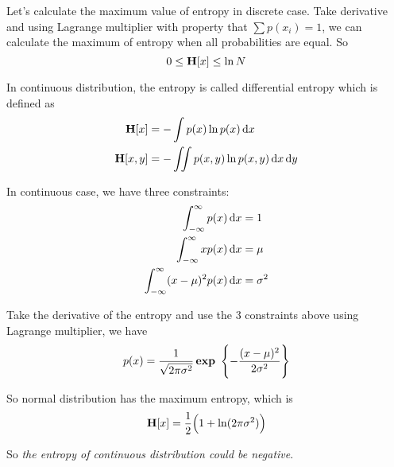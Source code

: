 \begin{theorem}
    Let's calculate the maximum value of entropy in discrete case. Take derivative and using Lagrange multiplier with property that $\sum p(x_i) = 1$, we can calculate the maximum of entropy when all probabilities are equal. So
    \begin{equation}
        0 \leq \entropy{x} \leq \ln N
    \end{equation}
\end{theorem}



\begin{definition}
    In continuous distribution, the entropy is called differential entropy which is defined as
    \begin{equation}
        \begin{aligned}
            \entropy{x} &= - \int p(x) \ln p(x) \dif x \\
            \entropy{x,y} &= - \iint p(x,y) \ln p(x,y) \dif x \dif y
        \end{aligned}
    \end{equation}
\end{definition}


\begin{theorem}
    In continuous case, we have three constraints:
    \begin{equation}
        \begin{aligned}
            \int_{-\infty}^{\infty} p(x) \dif x &= 1 \\
            \int_{-\infty}^{\infty} x p(x) \dif x &= \mu \\
            \int_{-\infty}^{\infty} (x-\mu)^2 p(x) \dif x &= \sigma^2 \\
        \end{aligned}
    \end{equation}
    
    Take the derivative of the entropy and use the 3 constraints above using Lagrange multiplier,  we have
    \begin{equation}
        p(x) = \frac{1}{\sqrt{2\pi \sigma^2}} \mathop{\bf exp\/}~\set{- \frac{(x-\mu)^2}{2 \sigma^2}}
    \end{equation}
    
    So normal distribution has the maximum entropy, which is 
    \begin{equation}
        \entropy{x} = \frac{1}{2} \mleft(1 + \ln (2\pi \sigma^2) \mright)
    \end{equation}
    
    So \emph{the entropy of continuous distribution could be negative}.
\end{theorem}


